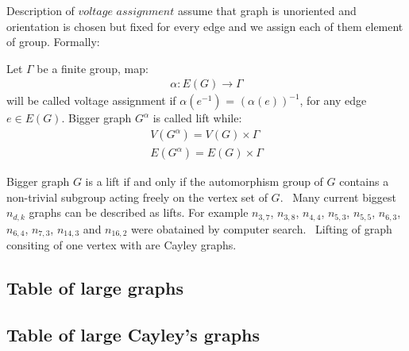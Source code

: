 \documentclass[a4paper,11pt,twoside]{report}%
\begin{document}
Description of $\textit{voltage assignment}$ assume that graph is unoriented and orientation is chosen but fixed for every edge and we assign each of them element of group. Formally: 

Let $\Gamma$ be a finite group, map:
\begin{align*}
	\alpha: E(G) \rightarrow \Gamma
\end{align*}	
will be called voltage assignment if $\alpha(e^{-1})$ = $(\alpha(e))^{-1}$, for any edge $e \in E(G)$. Bigger graph $G^{\alpha}$ is called lift while:  
\begin{align*}
	V(G^{\alpha}) = V(G) \times \Gamma \\
	E(G^{\alpha}) = E(G) \times \Gamma 
\end{align*}	


Bigger graph $G$ is a lift if and only if the automorphism group of $G$ contains a non-trivial subgroup acting freely on the vertex set of $G$.~\cite{Gross-Tucker} Many current biggest $n_{d,k}$ graphs can be described as lifts. For example $n_{3,7}$, $n_{3,8}$, $n_{4,4}$, $n_{5,3}$, $n_{5,5}$, $n_{6,3}$, $n_{6,4}$, $n_{7,3}$, $n_{14, 3}$ and $n_{16,2}$ were obatained by computer search.~\cite{Exoo} Lifting of graph consiting of one vertex with are Cayley graphs. 

\subsection{Table of large graphs}
\subsection{Table of large Cayley's graphs}

{}

\end{document}
